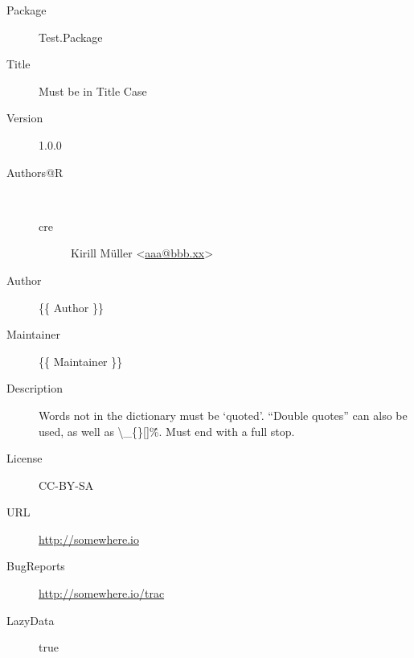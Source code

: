 \begin{description}
  \raggedright{}
  \item[Package] Test.Package
  \item[Title] Must be in Title Case
  \item[Version] 1.0.0
  \item[Authors@R] \\
    \begin{description}
      \item[cre] Kirill Müller <\href{mailto:aaa@bbb.xx}{aaa@bbb.xx}>
    \end{description}
  \item[Author] \{\{ Author \}\}
  \item[Maintainer] \{\{ Maintainer \}\}
  \item[Description] Words not in the dictionary must be `quoted'. ``Double quotes'' can also be used, as well as \textbackslash{}\_\{\}[]\^\%. Must end with a full stop.
  \item[License] CC-BY-SA
  \item[URL] \url{http://somewhere.io}
  \item[BugReports] \url{http://somewhere.io/trac}
  \item[LazyData] true
\end{description}
